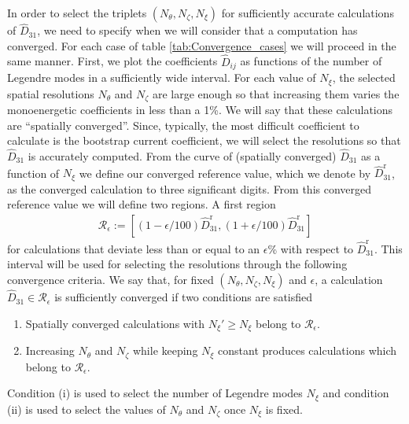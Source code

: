 \documentclass[10pt]{iopart}
\begin{document}
In order to select the triplets $(N_\theta,N_\zeta, N_\xi)$ for sufficiently accurate calculations of $\widehat{D}_{31}$, we need to specify when we will consider that a computation has converged. For each case of table \ref{tab:Convergence_cases} we will proceed in the same manner. First, we plot the coefficients $\widehat{D}_{ij}$ as functions of the number of Legendre modes in a sufficiently wide interval. For each value of $N_\xi$, the selected spatial resolutions $N_\theta$ and $N_\zeta$ are large enough so that increasing them varies the monoenergetic coefficients in less than a 1\%. We will say that these calculations are ``spatially converged''. Since, typically, the most difficult coefficient to calculate is the bootstrap current coefficient, we will select the resolutions so that $\widehat{D}_{31}$ is accurately computed. From the curve of (spatially converged) $\widehat{D}_{31}$ as a function of $N_\xi$ we define our converged reference value, which we denote by $\widehat{D}_{31}^{\text{r}}$, as the converged calculation to three significant digits. From this converged reference value we will define two regions. A first region
%
\begin{align}
	\mathcal{R}_{\epsilon}:=
	\left[
	(1-\epsilon/100)\widehat{D}_{31}^{\text{r}}, (1+\epsilon/100)\widehat{D}_{31}^{\text{r}} 
	\right]
\end{align} 
for calculations that deviate less than or equal to an $\epsilon$\% with respect to $\widehat{D}_{31}^{\text{r}}$. This interval will be used for selecting the resolutions through the following convergence criteria. We say that, for fixed $(N_\theta,N_\zeta,N_\xi)$ and $\epsilon$, a calculation $\widehat{D}_{31}\in\mathcal{R}_{\epsilon}$ is sufficiently converged if two conditions are satisfied 
%
\begin{enumerate}
	\item Spatially converged calculations with $N_\xi'\ge N_\xi$ belong to $\mathcal{R}_{\epsilon}$.
	\item Increasing $N_\theta$ and $N_\zeta$ while keeping $N_\xi$ constant produces calculations which belong to $\mathcal{R}_{\epsilon}$.
\end{enumerate}
Condition (i) is used to select the number of Legendre modes $N_\xi$ and condition (ii) is used to select the values of $N_\theta$ and $N_\zeta$ once $N_\xi$ is fixed. 
\end{document}
